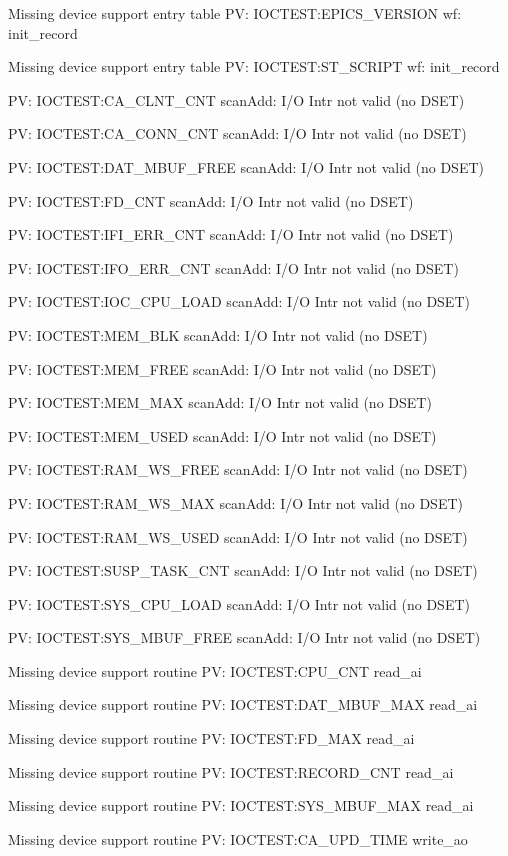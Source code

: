 Missing device support entry table PV: IOCTEST:EPICS_VERSION wf: init_record

Missing device support entry table PV: IOCTEST:ST_SCRIPT wf: init_record

PV: IOCTEST:CA_CLNT_CNT scanAdd: I/O Intr not valid (no DSET) 

PV: IOCTEST:CA_CONN_CNT scanAdd: I/O Intr not valid (no DSET) 

PV: IOCTEST:DAT_MBUF_FREE scanAdd: I/O Intr not valid (no DSET) 

PV: IOCTEST:FD_CNT scanAdd: I/O Intr not valid (no DSET) 

PV: IOCTEST:IFI_ERR_CNT scanAdd: I/O Intr not valid (no DSET) 

PV: IOCTEST:IFO_ERR_CNT scanAdd: I/O Intr not valid (no DSET) 

PV: IOCTEST:IOC_CPU_LOAD scanAdd: I/O Intr not valid (no DSET) 

PV: IOCTEST:MEM_BLK scanAdd: I/O Intr not valid (no DSET) 

PV: IOCTEST:MEM_FREE scanAdd: I/O Intr not valid (no DSET) 

PV: IOCTEST:MEM_MAX scanAdd: I/O Intr not valid (no DSET) 

PV: IOCTEST:MEM_USED scanAdd: I/O Intr not valid (no DSET) 

PV: IOCTEST:RAM_WS_FREE scanAdd: I/O Intr not valid (no DSET) 

PV: IOCTEST:RAM_WS_MAX scanAdd: I/O Intr not valid (no DSET) 

PV: IOCTEST:RAM_WS_USED scanAdd: I/O Intr not valid (no DSET) 

PV: IOCTEST:SUSP_TASK_CNT scanAdd: I/O Intr not valid (no DSET) 

PV: IOCTEST:SYS_CPU_LOAD scanAdd: I/O Intr not valid (no DSET) 

PV: IOCTEST:SYS_MBUF_FREE scanAdd: I/O Intr not valid (no DSET) 

Missing device support routine PV: IOCTEST:CPU_CNT read_ai

Missing device support routine PV: IOCTEST:DAT_MBUF_MAX read_ai

Missing device support routine PV: IOCTEST:FD_MAX read_ai

Missing device support routine PV: IOCTEST:RECORD_CNT read_ai

Missing device support routine PV: IOCTEST:SYS_MBUF_MAX read_ai

Missing device support routine PV: IOCTEST:CA_UPD_TIME write_ao

